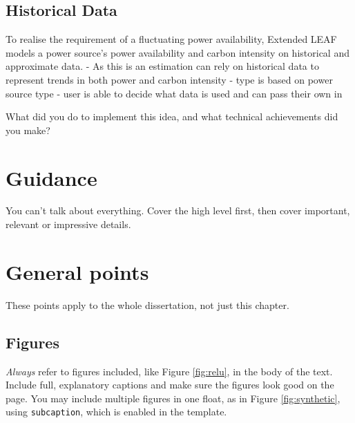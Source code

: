 \documentclass{l4proj}
\begin{document}
\subsection{Historical Data}\label{subsec:data Reading}
To realise the requirement of a fluctuating power availability, Extended LEAF models a power source's power availability and carbon intensity on historical and approximate data.
 - As this is an estimation can rely on historical data to represent trends in both power and carbon intensity
    - type is based on power source type
    - user is able to decide what data is used and can pass their own in


What did you do to implement this idea, and what technical achievements did you make?
\section{Guidance}
You can't talk about everything. Cover the high level first, then cover important, relevant or impressive details.



\section{General points}

These points apply to the whole dissertation, not just this chapter.



\subsection{Figures}
\emph{Always} refer to figures included, like Figure \ref{fig:relu}, in the body of the text. Include full, explanatory captions and make sure the figures look good on the page.
You may include multiple figures in one float, as in Figure \ref{fig:synthetic}, using \texttt{subcaption}, which is enabled in the template.
\end{document}

